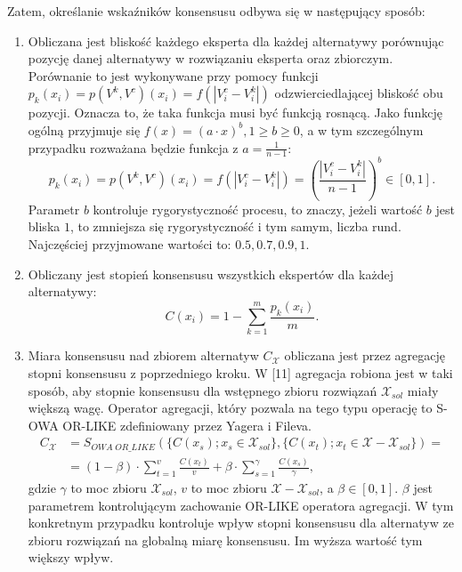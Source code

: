 Zatem, określanie wskaźników konsensusu odbywa się w następujący sposób:
\begin{enumerate}
  \item Obliczana jest bliskość każdego eksperta dla każdej alternatywy
  porównując pozycję danej alternatywy w rozwiązaniu eksperta oraz zbiorczym.
  Porównanie to jest wykonywane przy pomocy funkcji $p_k(x_i) = p(V^k,V^c)(x_i)
  = f(|V^c_i - V^k_i|)$ odzwierciedlającej bliskość obu pozycji. Oznacza to, że
  taka funkcja musi być funkcją rosnącą. Jako funkcję ogólną przyjmuje się
  $f(x) = (a \cdot x)^b, 1 \geq b \geq 0$, a w tym szczególnym przypadku
  rozważana będzie funkcja z $a = \frac{1}{n-1}$:
  \begin{equation}
  p_k(x_i) = p(V^k,V^c)(x_i) = f(|V^c_i - V^k_i|) = (\frac{|V^c_i -
  V^k_i|}{n-1})^b \in [0,1].
  \end{equation}
  Parametr $b$ kontroluje rygorystyczność procesu, to znaczy, jeżeli wartość $b$
  jest bliska $1$, to zmniejsza się rygorystyczność i tym samym, liczba rund.
  Najczęściej przyjmowane wartości to: $0.5, 0.7, 0.9, 1$.
  
  \item Obliczany jest stopień konsensusu wszystkich ekspertów dla każdej
  alternatywy:
  \begin{equation}
  C(x_i) = 1 - \sum_{k=1}^{m} \frac{p_k(x_i)}{m}.
  \end{equation}
  
  \item Miara konsensusu nad zbiorem alternatyw $C_{\mathcal{X}}$ obliczana jest
  przez agregację stopni konsensusu z poprzedniego kroku. W [11] agregacja
  robiona jest w taki sposób, aby stopnie konsensusu dla wstępnego zbioru
  rozwiązań $\mathcal{X}_{sol}$ miały większą wagę. Operator agregacji, który
  pozwala na tego typu operację to S-OWA OR-LIKE zdefiniowany przez Yagera i
  Fileva.
  \begin{equation}
  \begin{split}
  C_{\mathcal{X}} &= S_{OWA \; OR\_LIKE}(\{ C(x_s); x_s \in
  \mathcal{X}_{sol}\}, \{ C(x_t); x_t \in \mathcal{X} - \mathcal{X}_{sol} \}) =
  \\ 
  &= (1 - \beta)\cdot \sum_{t=1}^{v} \frac{C(x_t)}{v} + \beta \cdot
  \sum_{s=1}^{\gamma} \frac{C(x_s)}{\gamma},
  \end{split}
  \end{equation}
  gdzie $\gamma$ to moc zbioru $\mathcal{X}_{sol}$, $v$ to moc zbioru
  $\mathcal{X} - \mathcal{X}_{sol}$, a $\beta \in [0,1].$ $\beta$ jest
  parametrem kontrolującym zachowanie OR-LIKE operatora agregacji. W tym
  konkretnym przypadku kontroluje wpływ stopni konsensusu dla alternatyw ze
  zbioru rozwiązań na globalną miarę konsensusu. Im wyższa wartość tym większy
  wpływ.
  

\end{enumerate}
